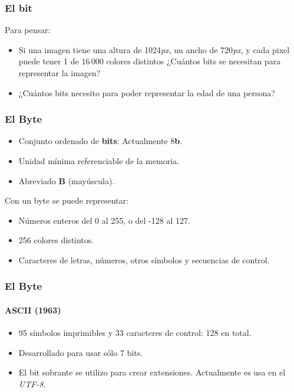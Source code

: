 \documentclass[11pt,a4paper,spanish]{beamer}
\newcommand{\bit}{\textbf{b}}
\newcommand{\Byte}{\textbf{B}}
\begin{document}
\begin{frame}
\frametitle{El bit}

Para pensar:

\begin{itemize}
    \item Si una imagen tiene una altura de 1024\emph{px}, un ancho de
        720\emph{px}, y cada pixel puede tener 1 de $16\,000$ colores
        distintos ¿Cuántos bits se necesitan para representar la imagen?
    \item ¿Cuántos bits necesito para poder representar la edad de una
        persona?
\end{itemize}

\end{frame}

\begin{frame}

\frametitle{El Byte}

    \begin{itemize}
        \item Conjunto ordenado de \textbf{bits}: Actualmente 8\bit.
        \item Unidad mínima referenciable de la memoria.
        \item Abreviado \Byte{} (mayúscula).
    \end{itemize}
    \pause

    Con un byte se puede representar:

    \begin{itemize}
        \item Números enteros del 0 al 255, o del -128 al 127.
        \item 256 colores distintos.
        \item Caracteres de letras, números, otros símbolos y secuencias de
            control.
    \end{itemize}

\end{frame}

\begin{frame}

\frametitle{El Byte}
\framesubtitle{ASCII (1963)}

\begin{itemize}
    \item 95 símbolos imprimibles y 33 caracteres de control: 128 en total.
    \item Desarrollado para usar sólo 7 bits.
    \item El bit sobrante se utilizo para crear extensiones. Actualmente es
        usa en el \emph{UTF-8}.
\end{itemize}

\end{frame}
\end{document}
